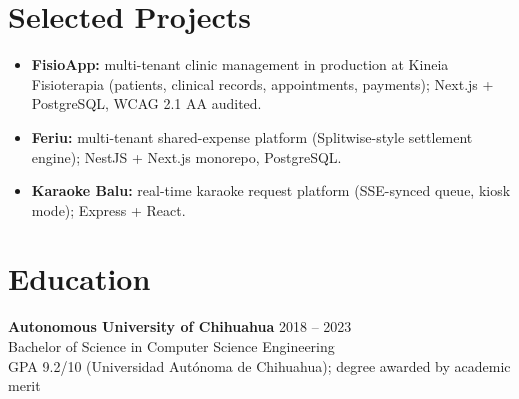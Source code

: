 \documentclass[10pt,letterpaper]{article}
\begin{document}
\section*{Selected Projects}
\begin{itemize}
    \item \textbf{FisioApp:} multi-tenant clinic management in production at Kineia Fisioterapia (patients, clinical records, appointments, payments); Next.js + PostgreSQL, WCAG 2.1 AA audited.
    \item \textbf{Feriu:} multi-tenant shared-expense platform (Splitwise-style settlement engine); NestJS + Next.js monorepo, PostgreSQL.
    \item \textbf{Karaoke Balu:} real-time karaoke request platform (SSE-synced queue, kiosk mode); Express + React.
\end{itemize}

\section*{Education}

\noindent\textbf{Autonomous University of Chihuahua} \hfill \textcolor{subtle}{2018 -- 2023}\\
Bachelor of Science in Computer Science Engineering\\
GPA 9.2/10 (Universidad Autónoma de Chihuahua); degree awarded by academic merit
\end{document}
